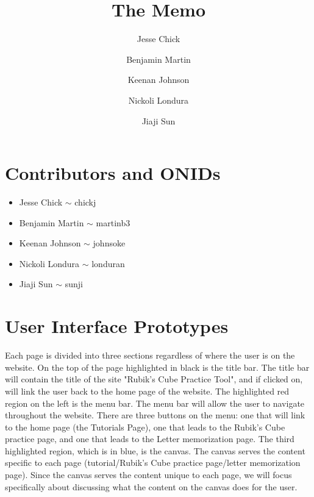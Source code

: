 \documentclass[12pt]{article}
\title{The Memo}
\author{Jesse Chick\\
\and Benjamin Martin\\
\and Keenan Johnson\\
\and Nickoli Londura\\
\and Jiaji Sun}
\begin{document}
\maketitle
\tableofcontents

\section{Contributors and ONIDs}
\begin{itemize}
	\item Jesse Chick $\sim$ chickj
	\item Benjamin Martin $\sim$ martinb3
	\item Keenan Johnson $\sim$ johnsoke
	\item Nickoli Londura $\sim$ londuran
	\item Jiaji Sun $\sim$ sunji
\end{itemize}

\section{User Interface Prototypes}
	\par
	Each page is divided into three sections regardless of where the user is on the website. On the top of the page highlighted in black is the title bar. The title bar will contain the title of the site "Rubik's Cube Practice Tool", and if clicked on, will link the user back to the home page of the website. The highlighted red region on the left is the menu bar. The menu bar will allow the user to navigate throughout the website. There are three buttons on the menu: one that will link to the home page (the Tutorials Page), one that leads to the Rubik's Cube practice page, and one that leads to the Letter memorization page. The third highlighted region, which is in blue, is the canvas. The canvas serves the content specific to each page (tutorial/Rubik's Cube practice page/letter memorization page). Since the canvas serves the content unique to each page, we will focus specifically about discussing what the content on the canvas does for the user.
\end{document}

